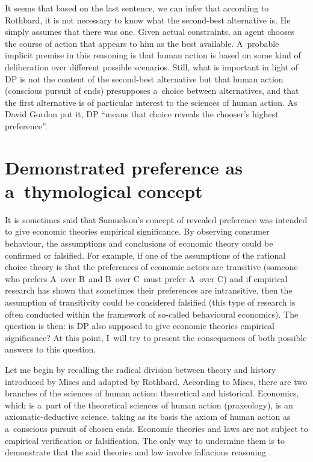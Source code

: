 It seems that based on the last sentence, we can infer that according to Rothbard, it is not necessary to know what the second-best alternative is. He simply assumes that there was one. Given actual constraints, an agent chooses the course of action that appears to him as the best available. A~probable implicit premise in this reasoning is that human action is based on some kind of deliberation over different possible scenarios. Still, what is important in light of DP is not the content of the second-best alternative but that human action (conscious pursuit of ends) presupposes a~choice between alternatives, and that the first alternative is of particular interest to the sciences of human action. As David Gordon 
\parencite*[][]{gordon_misunderstanding_2022} %
 put it, DP ``means that choice reveals the chooser's highest preference''.



\section{Demonstrated preference as a~thymological concept}

It is sometimes said that Samuelson's concept of revealed preference was intended to give economic theories empirical significance. By observing consumer behaviour, the assumptions and conclusions of economic theory could be confirmed or falsified. For example, if one of the assumptions of the rational choice theory is that the preferences of economic actors are transitive (someone who prefers A~over B~and B~over C~must prefer A~over C) and if empirical research has shown that sometimes their preferences are intransitive, then the assumption of transitivity could be considered falsified (this type of research is often conducted within the framework of so-called behavioural economics). The question is then: is DP also supposed to give economic theories empirical significance? At this point, I~will try to present the consequences of both possible answers to this question.



Let me begin by recalling the radical division between theory and history introduced by Mises and adapted by Rothbard. According to Mises, there are two branches of the sciences of human action: theoretical and historical. Economics, which is a~part of the theoretical sciences of human action (praxeology), is an axiomatic-deductive science, taking as its basis the axiom of human action as a~conscious pursuit of chosen ends. Economic theories and laws are not subject to empirical verification or falsification. The only way to undermine them is to demonstrate that the said theories and law involve fallacious reasoning 
\parencite[cf.][pp.30–41]{mises_human_1998}.%




